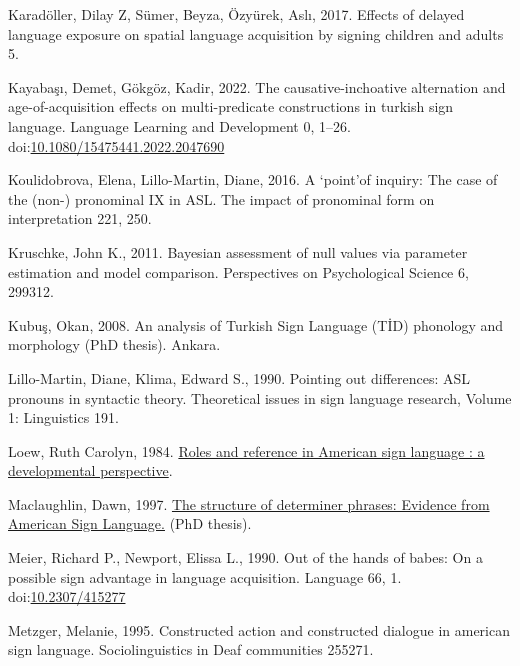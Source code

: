 \documentclass[]{elsarticle} %
\newlength{\cslhangindent}
\newenvironment{CSLReferences}[2] %
 {%
  \setlength{\parindent}{0pt}
  \ifodd #1 \everypar{\setlength{\hangindent}{\cslhangindent}}\ignorespaces\fi
  \ifnum #2 > 0
  \setlength{\parskip}{#2\baselineskip}
  \fi
 }%
 {}
\begin{document}
\begin{CSLReferences}{1}{0}
\leavevmode{}%
Karadöller, Dilay Z, Sümer, Beyza, Özyürek, Aslı, 2017. Effects of
delayed language exposure on spatial language acquisition by signing
children and adults 5.

\leavevmode{}%
Kayabaşı, Demet, Gökgöz, Kadir, 2022. The causative-inchoative
alternation and age-of-acquisition effects on multi-predicate
constructions in turkish sign language. Language Learning and
Development 0, 1--26.
doi:\href{https://doi.org/10.1080/15475441.2022.2047690}{10.1080/15475441.2022.2047690}

\leavevmode{}%
Koulidobrova, Elena, Lillo-Martin, Diane, 2016. A {`}point{'}of inquiry:
The case of the (non-) pronominal IX in ASL. The impact of pronominal
form on interpretation 221, 250.

\leavevmode{}%
Kruschke, John K., 2011. Bayesian assessment of null values via
parameter estimation and model comparison. Perspectives on Psychological
Science 6, 299312.

\leavevmode{}%
Kubuş, Okan, 2008. An analysis of Turkish Sign Language (T{İ}D)
phonology and morphology (PhD thesis). Ankara.

\leavevmode{}%
Lillo-Martin, Diane, Klima, Edward S., 1990. Pointing out differences:
ASL pronouns in syntactic theory. Theoretical issues in sign language
research, Volume 1: Linguistics 191.

\leavevmode{}%
Loew, Ruth Carolyn, 1984.
\href{https:///paper/Roles-and-reference-in-American-sign-language-\%3A-a-Loew/315c2c539d3bd88fbc13564775141ba4a60ac5aa}{Roles
and reference in American sign language : a developmental perspective}.

\leavevmode{}%
Maclaughlin, Dawn, 1997.
\href{http://lear.unive.it/jspui/handle/11707/7016}{The structure of
determiner phrases: Evidence from American Sign Language.} (PhD thesis).

\leavevmode{}%
Meier, Richard P., Newport, Elissa L., 1990. Out of the hands of babes:
On a possible sign advantage in language acquisition. Language 66, 1.
doi:\href{https://doi.org/10.2307/415277}{10.2307/415277}

\leavevmode{}%
Metzger, Melanie, 1995. Constructed action and constructed dialogue in
american sign language. Sociolinguistics in Deaf communities 255271.


\end{CSLReferences}
\end{document}
